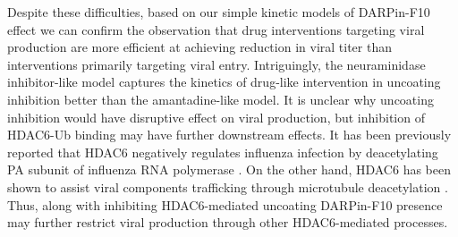 Despite these difficulties, based on our simple kinetic models of DARPin-F10 effect we can confirm the observation \cite{heldt2013multiscale} that drug interventions targeting viral production are more efficient at achieving reduction in viral titer than interventions primarily targeting viral entry. Intriguingly, the neuraminidase inhibitor-like model captures the kinetics of drug-like intervention in uncoating inhibition better than the amantadine-like model. It is unclear why uncoating inhibition would have disruptive effect on viral production, but inhibition of HDAC6-Ub binding may have further downstream effects. It has been previously reported that HDAC6 negatively regulates influenza infection by deacetylating PA subunit of influenza RNA polymerase \cite{chen2019hdac6}. On the other hand, HDAC6 has been shown to assist viral components trafficking through microtubule deacetylation \cite{husain2014histone}. Thus, along with inhibiting HDAC6-mediated uncoating DARPin-F10 presence may further restrict viral production through other HDAC6-mediated processes.
